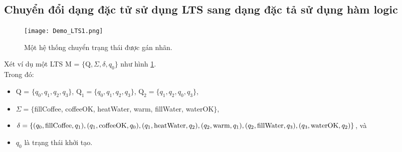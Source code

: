\documentclass[a4paper,13pt,oneside,openany]{book}
\begin{document}
\begin{flushleft}
	\section{Chuyển đổi dạng đặc tử sử dụng LTS sang dạng đặc tả sử dụng hàm logic}
	\begin{figure}[h]
		\centering
		\texttt{[image: Demo\_LTS1.png]}
		\caption{Một hệ thống chuyển trạng thái được gán nhãn.}
		\label{fig:Demo_LTS1}
	\end{figure}
	\noindent
	Xét ví dụ một LTS M = $\{\textrm{Q}, \Sigma, \delta, q_0\}$ như hình \ref{fig:Demo_LTS1}.\\
	Trong đó:
	\begin{itemize}
		\item Q = $\{q_0, q_1, q_2, q_3\}$, $\textrm{Q}_1 = \{q_0, q_1, q_2, q_3\}$, $\textrm{Q}_2 = \{q_1, q_2, q_0, q_3\}$,
		\item $\Sigma = \{$fillCoffee, coffeeOK, heatWater, warm, fillWater, waterOK$\}$,
		\item $\delta = \{(q_0, \textrm{fillCoffee}, q_1), (q_1, \textrm{coffeeOK}, q_0), (q_1, \textrm{heatWater}, q_2), (q_2, \textrm{warm}, q_1),\\ (q_2, \textrm{fillWater}, q_3), (q_3, \textrm{waterOK}, q_2)\}$, và
		\item $q_0$ là trạng thái khởi tạo.
	\end{itemize}


\end{flushleft}
\end{document}
